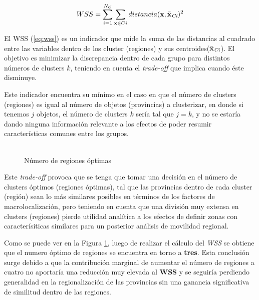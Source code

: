 \documentclass[12pt,a4paper]{article}
\begin{document}
\begin {center}
\begin{equation}\label{eq:wss}
WSS=\sum_{i=1}^{N_{C}} \sum_{\textbf{x}\in Ci} distancia(\textbf{x},\bar{\textbf{x}}_{\tiny{\textit{Ci}}})^{2}
\end{equation}
\end {center}

El WSS (\ref{eq:wss}) es un indicador que mide la suma de las distancias al cuadrado entre las variables dentro de  los cluster (regiones) y sus centroides($\bar{\textbf{x}}_{\tiny{\textit{Ci}}}$). El objetivo es minimizar la discrepancia dentro de cada grupo para distintos números de clusters $k$, teniendo en cuenta el \textit{trade-off} que implica cuando éste disminuye. 

Este indicador encuentra su mínimo en el caso en que el número de clusters (regiones) es igual al número de objetos (provincias) a clusterizar, en donde si tenemos $j$ objetos, el número de clusters $k$ sería tal que $j=k$, y no se estaría dando ninguna información relevante a los efectos de poder resumir características comunes entre los grupos. 

\begin{figure}[htbp!]
\begin{center}
	\caption{\\Número de regiones óptimas}
 	
	\label{figure:optimas}
\end{center}
\end{figure}

Este \textit{trade-off} provoca que se tenga que tomar una decisión en el número de clusters óptimos (regiones óptimas), tal que las provincias dentro de cada cluster (región) sean lo más similares posibles en términos de los factores de macrolocalización, pero teniendo en cuenta que una división muy extensa en clusters (regiones) pierde utilidad analítica a los efectos de definir zonas con caracterísiticas similares para un posterior análisis de movilidad regional.

Como se puede ver en la Figura \ref{figure:optimas}, luego de realizar el cálculo del \textit{WSS} se obtiene que el numero óptimo de regiones se encuentra en torno a \textbf{tres}. Esta conclusión surge debido a que la contribución marginal de aumentar el número de regiones a cuatro no aportaría una reducción muy elevada al \textbf{WSS} y se seguiría perdiendo generalidad en la regionalización de las provincias sin una ganancia significativa de similitud dentro de las regiones.
\end{document}
